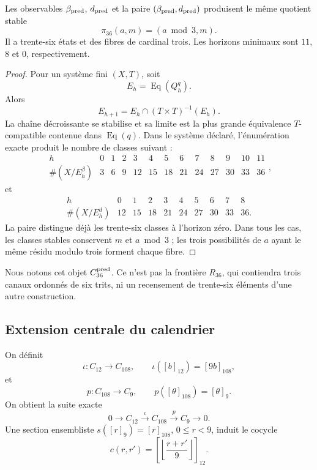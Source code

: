 \begin{theorem}
\label{p12-83-c1-s13:thm:tpk-cociente-predictivo-36}
Les observables \(\beta_{\rm pred}\), \(d_{\rm pred}\) et la paire
\((\beta_{\rm pred},d_{\rm pred})\) produisent le même quotient stable
\[
 \pi_{36}(a,m)=(a\bmod3,m).
\]
Il a trente-six états et des fibres de cardinal trois. Les horizons
minimaux sont \(11\), \(8\) et \(0\), respectivement.
\end{theorem}

\begin{proof}
Pour un système fini \((X,T)\), soit
\[
 E_h=\operatorname{Eq}(Q_h^q).
\]
Alors
\[
 E_{h+1}=E_h\cap(T\times T)^{-1}(E_h).
\]
La chaîne décroissante se stabilise et sa limite est la plus grande équivalence
\(T\)-compatible contenue dans \(\operatorname{Eq}(q)\). Dans le système
déclaré, l’énumération exacte produit le nombre de classes suivant :
\[
\begin{array}{c|rrrrrrrrrrrr}
h&0&1&2&3&4&5&6&7&8&9&10&11\\\hline
\#(X/E_h^{\beta})&3&6&9&12&15&18&21&24&27&30&33&36
\end{array},
\]
et
\[
\begin{array}{c|rrrrrrrrr}
h&0&1&2&3&4&5&6&7&8\\\hline
\#(X/E_h^{d})&12&15&18&21&24&27&30&33&36.
\end{array}
\]
La paire distingue déjà les trente-six classes à l’horizon zéro. Dans tous
les cas, les classes stables conservent \(m\) et \(a\bmod3\) ; les trois
possibilités de \(a\) ayant le même résidu modulo trois forment chaque fibre.
\end{proof}

Nous notons cet objet \(C_{36}^{\rm pred}\). Ce n’est pas la frontière
\(R_{36}\), qui contiendra trois canaux ordonnés de six trits, ni un recensement
de trente-six éléments d’une autre construction.

\subsection{Extension centrale du calendrier}

On définit
\[
 \iota:C_{12}\longrightarrow C_{108},
 \qquad \iota([b]_{12})=[9b]_{108},
\]
et
\[
 p:C_{108}\longrightarrow C_9,
 \qquad p([\theta]_{108})=[\theta]_9.
\]
On obtient la suite exacte
\begin{equation}
 0\longrightarrow C_{12}
 \xrightarrow{\ \iota\ }C_{108}
 \xrightarrow{\ p\ }C_9
 \longrightarrow0.
\label{p12-83-c1-s13:eq:tpk-extension-12-108-9}
\end{equation}
Une section ensembliste \(s([r]_9)=[r]_{108}\),
\(0\leq r<9\), induit le cocycle
\[
 c(r,r')=
 \left[\left\lfloor\frac{r+r'}{9}\right\rfloor\right]_{12}.
\]

